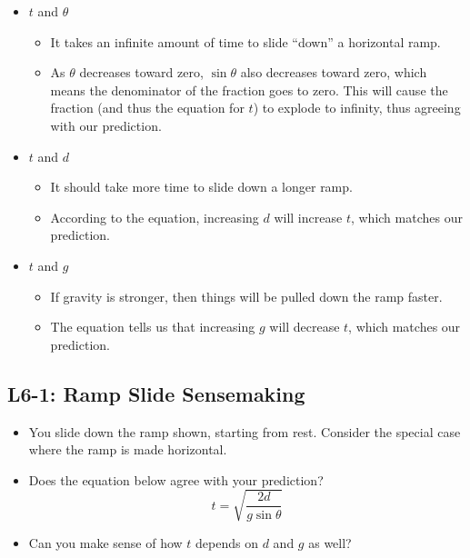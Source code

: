 \documentclass[]{article}
\begin{document}
\newpage
\begin{TeacherMargin}
\begin{itemize}
	\item $t$ and $\theta$
	\begin{itemize}
		\item It takes an infinite amount of time to slide ``down'' a horizontal ramp.
		\item As $\theta$ decreases toward zero, $\sin\theta$ also decreases toward zero, which means the denominator of the fraction goes to zero. This will cause the fraction (and thus the equation for $t$) to explode to infinity, thus agreeing with our prediction.
	\end{itemize}
	\item $t$ and $d$
	\begin{itemize}
		\item It should take more time to slide down a longer ramp.
		\item According to the equation, increasing $d$ will increase $t$, which matches our prediction.
	\end{itemize}
	\item $t$ and $g$
	\begin{itemize}
		\item If gravity is stronger, then things will be pulled down the ramp faster.
		\item The equation tells us that increasing $g$ will decrease $t$, which matches our prediction.
	\end{itemize}
\end{itemize}
\end{TeacherMargin}
\begin{PresentSpace}
\vspace{-10pt}
\section*{L6-1: Ramp Slide Sensemaking}
\vspace{-10pt}
\parbox{10cm}{
\begin{itemize}
	\item You slide down the ramp shown, starting from rest. Consider the special case where the ramp is made horizontal.
	\item Does the equation below agree with your prediction?
	\[
	t=\sqrt{\frac{2d}{g\sin\theta}}
	\]
	\item Can you make sense of how $t$ depends on $d$ and $g$ as well?
\end{itemize}
}
\end{PresentSpace}
\end{document}
